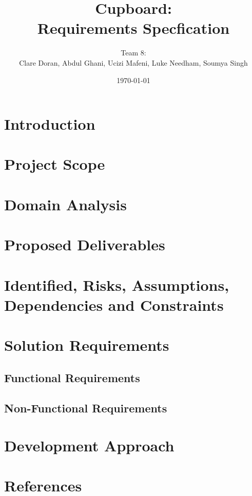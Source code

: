 \documentclass[12pt]{article}
\title{Cupboard:\\Requirements Specfication}
\author{Team 8:\\Clare Doran, Abdul Ghani, Ucizi Mafeni, Luke Needham, Soumya Singh}
\date{\today}
\begin{document}
\maketitle

\tableofcontents
\clearpage

\section{Introduction}
\section{Project Scope}
\section{Domain Analysis}
\section{Proposed Deliverables}
\section{Identified, Risks, Assumptions, Dependencies and Constraints}
\section{Solution Requirements}
\subsection{Functional Requirements}
\subsection{Non-Functional Requirements}
\section{Development Approach}
\section{References}
\end{document}

